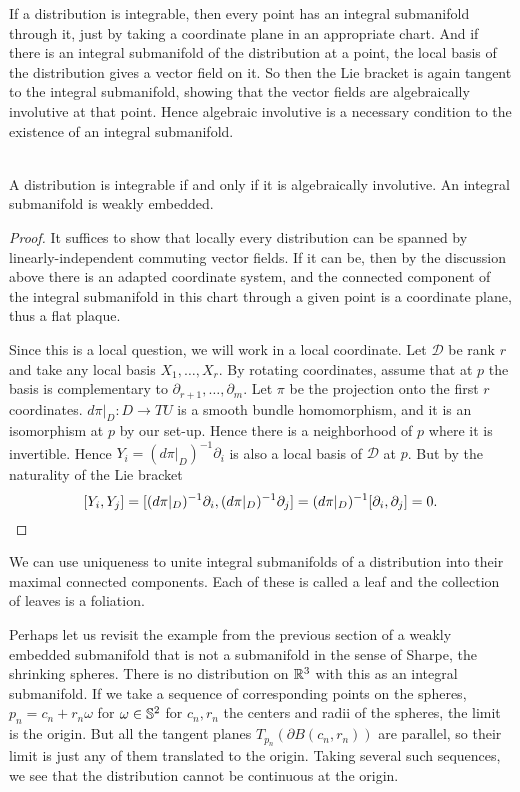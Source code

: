 If a distribution is integrable, then every point has an integral submanifold through it, just by taking a coordinate plane in an appropriate chart.
And if there is an integral submanifold of the distribution at a point, the local basis of the distribution gives a vector field on it.
So then the Lie bracket is again tangent to the integral submanifold, showing that the vector fields are algebraically involutive at that point.
Hence algebraic involutive is a necessary condition to the existence of an integral submanifold.

\begin{theorem}
\label{thm:frobenius}
\textup{\cite[Thm~2.4.1,~Cor~2.4.2]{Sharpe1997}\cite[Thm~1.60,~1.62]{Warner1983}\cite[Thm~19.2]{Lee2012}} \\
A distribution is integrable if and only if it is algebraically involutive.
An integral submanifold is weakly embedded.
\end{theorem}
\begin{proof}
It suffices to show that locally every distribution can be spanned by linearly-independent commuting vector fields.
If it can be, then by the discussion above there is an adapted coordinate system, and the connected component of the integral submanifold in this chart through a given point is a coordinate plane, thus a flat plaque.

Since this is a local question, we will work in a local coordinate.
Let $\mathcal{D}$ be rank $r$ and take any local basis $X_1, \dots, X_r$.
By rotating coordinates, assume that at $p$ the basis is complementary to $\partial_{r+1},\dots,\partial_{m}$.
Let $\pi$ be the projection onto the first $r$ coordinates.
$d\pi|_D : D \to TU$ is a smooth bundle homomorphism, and it is an isomorphism at $p$ by our set-up.
Hence there is a neighborhood of $p$ where it is invertible.
Hence $Y_i = (d\pi|_D)^{-1} \partial_i$ is also a local basis of $\mathcal{D}$ at $p$.
But by the naturality of the Lie bracket 
\[
[Y_i, Y_j] 
= [(d\pi|_D)^{-1} \partial_i, (d\pi|_D)^{-1} \partial_j]
= (d\pi|_D)^{-1} [\partial_i, \partial_j]
= 0.
\qedhere
\]
\end{proof}

We can use uniqueness to unite integral submanifolds of a distribution into their maximal connected components.
Each of these is called a leaf and the collection of leaves is a foliation.

Perhaps let us revisit the example from the previous section of a weakly embedded submanifold that is not a submanifold in the sense of Sharpe, the shrinking spheres.
There is no distribution on $\mathbb{R}^3$ with this as an integral submanifold. 
If we take a sequence of corresponding points on the spheres, $p_n = c_n + r_n \omega$ for $\omega \in \mathbb{S}^2$ for $c_n,r_n$ the centers and radii of the spheres, the limit is the origin. 
But all the tangent planes $T_{p_n}(\partial B(c_n,r_n))$ are parallel, so their limit is just any of them translated to the origin.
Taking several such sequences, we see that the distribution cannot be continuous at the origin.



